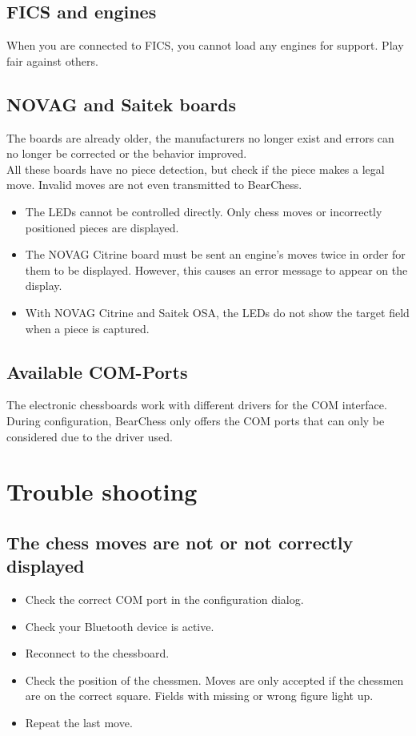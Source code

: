 \documentclass[11pt,a4paper]{article}
\begin{document}
\subsection{FICS and engines}
When you are connected to FICS, you cannot load any engines for support. Play fair against others.

\subsection{NOVAG and Saitek boards}
The boards are already older, the manufacturers no longer exist and errors can no longer be corrected or the behavior improved.\\
All these boards have no piece detection, but check if the piece makes a legal move. Invalid moves are not even transmitted to BearChess.
\begin{itemize}
	\item The LEDs cannot be controlled directly. Only chess moves or incorrectly positioned pieces are displayed.
	\item The NOVAG Citrine board must be sent an engine's moves twice in order for them to be displayed. However, this causes an error message to appear on the display.
	\item With NOVAG Citrine and Saitek OSA, the LEDs do not show the target field when a piece is captured.
\end{itemize}

\subsection{Available COM-Ports}
The electronic chessboards work with different drivers for the COM interface. During configuration, BearChess only offers the COM ports that can only be considered due to the driver used.

\section{Trouble shooting}

\subsection{The chess moves are not or not correctly displayed}
\begin{itemize}
	\item Check the correct COM port in the configuration dialog.
	\item Check your Bluetooth device is active.	
	\item Reconnect to the chessboard.	
	\item Check the position of the chessmen. Moves are only accepted if the chessmen are on the correct square. Fields with missing or wrong figure light up.
	\item Repeat the last move.
\end{itemize}
\end{document}
